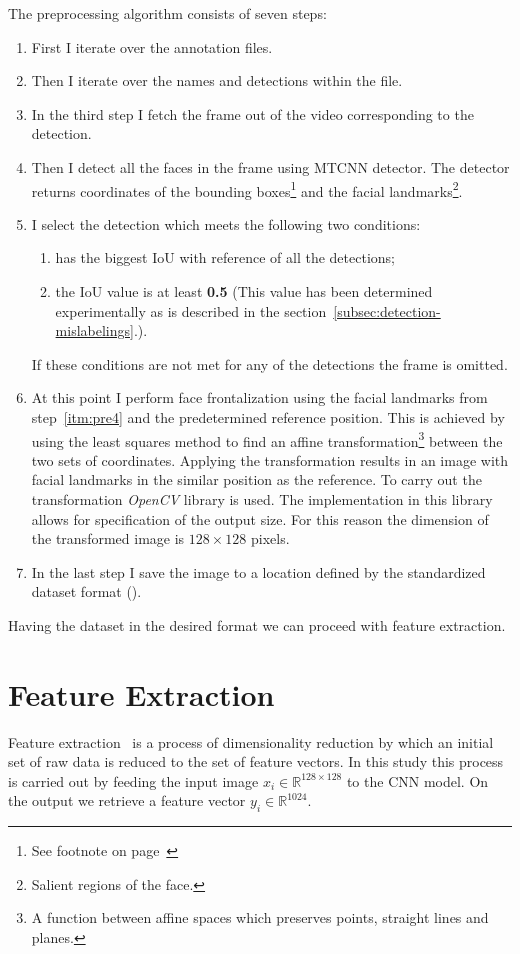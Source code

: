 The preprocessing algorithm consists of seven steps:
\begin{enumerate}
    \item First I iterate over the annotation files.
    \item Then I iterate over the names and detections within the file.
    \item In the third step I fetch the frame out of the video corresponding to the detection.
    \item \label{itm:pre4} Then I detect all the faces in the frame using MTCNN detector.
    The detector returns coordinates of the bounding boxes\footnote{See footnote on page~\pageref{foot:bbox}} and the
    facial landmarks\footnote{Salient regions of the face.}.
    \item I select the detection which meets the following two conditions:
    \begin{enumerate}
        \item has the biggest IoU with reference of all the detections;
        \item the IoU value is at least \textbf{0.5} (This value has been determined experimentally as
        is described in the section~\ref{subsec:detection-mislabelings}.).
    \end{enumerate}
    If these conditions are not met for any of the detections the frame is omitted.
    \item At this point I perform face frontalization using the facial landmarks from step~\ref{itm:pre4} and the
    predetermined reference position.
    This is achieved by using the least squares method to find an affine transformation\footnote{A function between
    affine spaces which preserves points, straight lines and planes.} between the two sets of coordinates.
    Applying the transformation results in an image with facial landmarks in the similar position as the reference.
    To carry out the transformation \textit{OpenCV} library is used.
    The implementation in this library allows for specification of the output size.
    For this reason the dimension of the transformed image is $128 \times 128$ pixels.
    \item In the last step I save the image to a location defined by the standardized dataset format
    ().
\end{enumerate}

Having the dataset in the desired format we can proceed with feature extraction.

\section{Feature Extraction}\label{sec:feature-extraction}
Feature extraction~\cite{FeEx} is a process of dimensionality reduction by which an initial set of raw data
is reduced to the set of feature vectors.
In this study this process is carried out by feeding the input image $x_i \in \mathbb{R}^{128\times128 }$ to the CNN model.
On the output we retrieve a feature vector $y_i \in \mathbb{R}^{1024}$.

